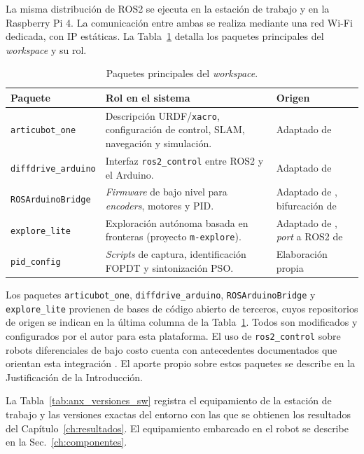 \begin{appendices}
La misma distribución de \gls{ROS2} se ejecuta en la estación de trabajo y en la Raspberry Pi 4. La comunicación entre ambas se realiza mediante una red Wi-Fi dedicada, con IP estáticas. La Tabla~\ref{tab:anx_ws_roles} detalla los paquetes principales del \textit{workspace} y su rol.

\begin{table}[H]
\centering
\caption{Paquetes principales del \textit{workspace}.}
\label{tab:anx_ws_roles}
\small
\begin{tabular}{p{3.2cm} p{6.1cm} p{4.7cm}}
\toprule
\textbf{Paquete} & \textbf{Rol en el sistema} & \textbf{Origen} \\
\midrule
\texttt{articubot\_one} & Descripción URDF/\texttt{xacro}, configuración de control, SLAM, navegación y simulación. & Adaptado de \citep{newans_articubot} \\
\texttt{diffdrive\_arduino} & Interfaz \texttt{ros2\_control} entre \gls{ROS2} y el \gls{Arduino}. & Adaptado de \citep{newans_diffdrive} \\
\texttt{ROSArduinoBridge} & \textit{Firmware} de bajo nivel para \textit{encoders}, motores y PID. & Adaptado de \citep{newans_rosarduinobridge}, bifurcación de \citep{hbrobotics_rosarduinobridge} \\
\texttt{explore\_lite} & Exploración autónoma basada en fronteras (proyecto \texttt{m-explore}). & Adaptado de \citep{alvarez2021mexplore_ros2}, \textit{port} a \gls{ROS2} de \citep{horner_mexplore} \\
\texttt{pid\_config} & \textit{Scripts} de captura, identificación FOPDT y sintonización PSO. & Elaboración propia \\
\bottomrule
\end{tabular}
\end{table}

\noindent Los paquetes \texttt{articubot\_one}, \texttt{diffdrive\_arduino},
\texttt{ROSArduinoBridge} y \texttt{explore\_lite} provienen de bases de
código abierto de terceros, cuyos repositorios de origen se indican en la
última columna de la Tabla~\ref{tab:anx_ws_roles}. Todos son modificados
y configurados por el autor para esta plataforma. El uso de
\texttt{ros2\_control} sobre robots diferenciales de bajo costo cuenta con
antecedentes documentados que orientan esta integración
\citep{amadi2024introduction}. El aporte propio sobre estos paquetes se
describe en la Justificación de la Introducción.

La Tabla~\ref{tab:anx_versiones_sw} registra el equipamiento de la estación
de trabajo y las versiones exactas del entorno con las que se obtienen
los resultados del Capítulo~\ref{ch:resultados}. El equipamiento embarcado
en el robot se describe en la Sec.~\ref{ch:componentes}.


\end{appendices}
